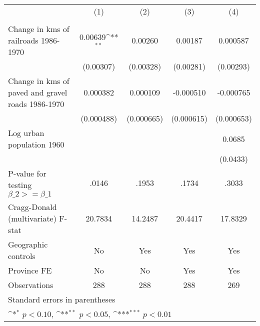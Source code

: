 {
\def\sym#1{\ifmmode^{#1}\else\(^{#1}\)\fi}
\begin{tabular}{l*{4}{c}}
\hline\hline
                &\multicolumn{1}{c}{(1)}&\multicolumn{1}{c}{(2)}&\multicolumn{1}{c}{(3)}&\multicolumn{1}{c}{(4)}\\
                &\multicolumn{1}{c}{}&\multicolumn{1}{c}{}&\multicolumn{1}{c}{}&\multicolumn{1}{c}{}\\
\hline
Change in kms of railroads 1986-1970&  0.00639\sym{**} &  0.00260         &  0.00187         & 0.000587         \\
                &(0.00307)         &(0.00328)         &(0.00281)         &(0.00293)         \\
[1em]
Change in kms of paved and gravel roads 1986-1970& 0.000382         & 0.000109         &-0.000510         &-0.000765         \\
                &(0.000488)         &(0.000665)         &(0.000615)         &(0.000653)         \\
[1em]
Log urban population 1960&                  &                  &                  &   0.0685         \\
                &                  &                  &                  & (0.0433)         \\
\hline
P-value for testing $\beta\_{2} >= \beta\_{1}$&    .0146         &    .1953         &    .1734         &    .3033         \\
Cragg-Donald (multivariate) F-stat&  20.7834         &  14.2487         &  20.4417         &  17.8329         \\
Geographic controls&       No         &      Yes         &      Yes         &      Yes         \\
Province FE     &       No         &       No         &      Yes         &      Yes         \\
Observations    &      288         &      288         &      288         &      269         \\
\hline\hline
\multicolumn{5}{l}{\footnotesize Standard errors in parentheses}\\
\multicolumn{5}{l}{\footnotesize \sym{*} \(p<0.10\), \sym{**} \(p<0.05\), \sym{***} \(p<0.01\)}\\
\end{tabular}
}
